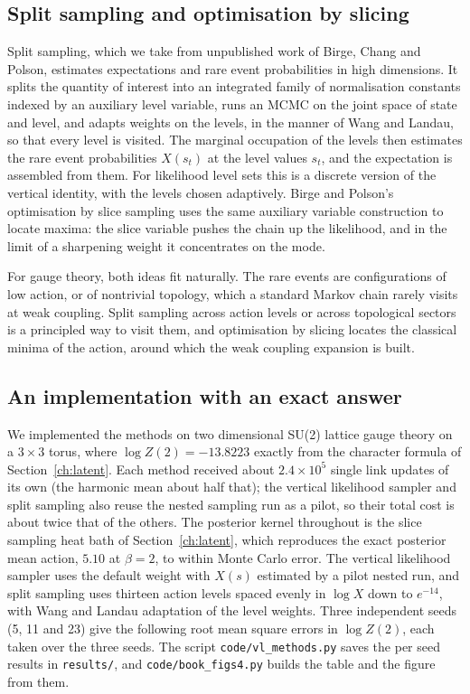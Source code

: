 \subsection{Split sampling and optimisation by slicing}

Split sampling, which we take from unpublished work of Birge, Chang and Polson, estimates expectations and rare event probabilities in high dimensions. It splits the quantity of interest into an integrated family of normalisation constants indexed by an auxiliary level variable, runs an MCMC on the joint space of state and level, and adapts weights on the levels, in the manner of Wang and Landau, so that every level is visited. The marginal occupation of the levels then estimates the rare event probabilities $X(s_t)$ at the level values $s_t$, and the expectation is assembled from them. For likelihood level sets this is a discrete version of the vertical identity, with the levels chosen adaptively. Birge and Polson's optimisation by slice sampling \cite{BP} uses the same auxiliary variable construction to locate maxima: the slice variable pushes the chain up the likelihood, and in the limit of a sharpening weight it concentrates on the mode.

For gauge theory, both ideas fit naturally. The rare events are configurations of low action, or of nontrivial topology, which a standard Markov chain rarely visits at weak coupling. Split sampling across action levels or across topological sectors is a principled way to visit them, and optimisation by slicing locates the classical minima of the action, around which the weak coupling expansion is built.

\subsection{An implementation with an exact answer}

We implemented the methods on two dimensional SU(2) lattice gauge theory on a $3\times3$ torus, where $\log Z(2)=-13.8223$ exactly from the character formula of Section~\ref{ch:latent}. Each method received about $2.4\times10^5$ single link updates of its own (the harmonic mean about half that); the vertical likelihood sampler and split sampling also reuse the nested sampling run as a pilot, so their total cost is about twice that of the others. The posterior kernel throughout is the slice sampling heat bath of Section~\ref{ch:latent}, which reproduces the exact posterior mean action, $5.10$ at $\beta=2$, to within Monte Carlo error. The vertical likelihood sampler uses the default weight with $X(s)$ estimated by a pilot nested run, and split sampling uses thirteen action levels spaced evenly in $\log X$ down to $e^{-14}$, with Wang and Landau adaptation of the level weights. Three independent seeds (5, 11 and 23) give the following root mean square errors in $\log Z(2)$, each taken over the three seeds. The script \texttt{code/vl\_methods.py} saves the per seed results in \texttt{results/}, and \texttt{code/book\_figs4.py} builds the table and the figure from them.

